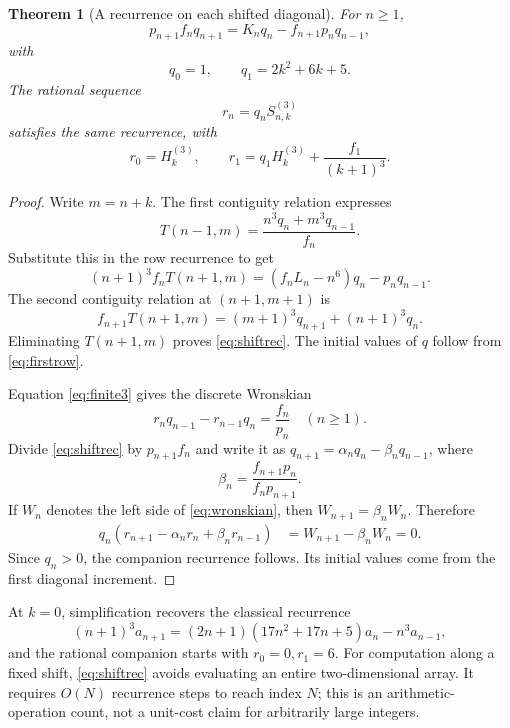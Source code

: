 \documentclass[11pt]{article}
\numberwithin{equation}{section}
\newtheorem{theorem}{Theorem}[section]
\theoremstyle{definition}
\theoremstyle{remark}
\newcommand{\HS}[2]{H_{#1}^{(#2)}}
\newcommand{\Sthree}[2]{S^{(3)}_{#1,#2}}
\begin{document}
\begin{theorem}[A recurrence on each shifted diagonal]\label{thm:shiftrec}
For $n\geq1$,
\begin{equation}\label{eq:shiftrec}
 p_{n+1}f_nq_{n+1}=K_nq_n-f_{n+1}p_nq_{n-1},
\end{equation}
with
\begin{equation}\label{eq:qinit}
 q_0=1,\qquad q_1=2k^2+6k+5.
\end{equation}
The rational sequence
\begin{equation}\label{eq:rdef}
 r_n=q_n\Sthree{n}{k}
\end{equation}
satisfies the same recurrence, with
\begin{equation}\label{eq:rinit}
 r_0=\HS{k}{3},\qquad
 r_1=q_1\HS{k}{3}+\frac{f_1}{(k+1)^3}.
\end{equation}
\end{theorem}
\begin{proof}
Write $m=n+k$. The first contiguity relation expresses
\[
 T(n-1,m)=\frac{n^3q_n+m^3q_{n-1}}{f_n}.
\]
Substitute this in the row recurrence to get
\[
 (n+1)^3f_nT(n+1,m)
 =(f_nL_n-n^6)q_n-p_nq_{n-1}.
\]
The second contiguity relation at $(n+1,m+1)$ is
\[
 f_{n+1}T(n+1,m)=(m+1)^3q_{n+1}+(n+1)^3q_n.
\]
Eliminating $T(n+1,m)$ proves \eqref{eq:shiftrec}.
The initial values of $q$ follow from \eqref{eq:firstrow}.

Equation \eqref{eq:finite3} gives the discrete Wronskian
\begin{equation}\label{eq:wronskian}
 r_nq_{n-1}-r_{n-1}q_n=\frac{f_n}{p_n}\quad(n\geq1).
\end{equation}
Divide \eqref{eq:shiftrec} by $p_{n+1}f_n$ and write it as
$q_{n+1}=\alpha_nq_n-\beta_nq_{n-1}$, where
\[
 \beta_n=\frac{f_{n+1}p_n}{f_np_{n+1}}.
\]
If $W_n$ denotes the left side of \eqref{eq:wronskian}, then
$W_{n+1}=\beta_nW_n$. Therefore
\begin{align*}
 q_n(r_{n+1}-\alpha_nr_n+\beta_nr_{n-1})
 &=W_{n+1}-\beta_nW_n=0.
\end{align*}
Since $q_n>0$, the companion recurrence follows. Its initial values
come from the first diagonal increment.
\end{proof}

At $k=0$, simplification recovers the classical recurrence
\begin{equation}\label{eq:aperyrec}
 (n+1)^3a_{n+1}
 =(2n+1)(17n^2+17n+5)a_n-n^3a_{n-1},
\end{equation}
and the rational companion starts with $r_0=0,r_1=6$.
For computation along a fixed shift, \eqref{eq:shiftrec} avoids evaluating
an entire two-dimensional array. It requires $O(N)$ recurrence steps
to reach index $N$; this is an arithmetic-operation count, not a
unit-cost claim for arbitrarily large integers.
\end{document}
